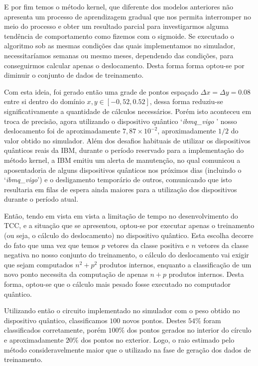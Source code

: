 E por fim temos o método kernel, que diferente dos modelos anteriores não apresenta um processo de aprendizagem gradual que nos permita interromper no meio do processo e obter um resultado parcial para investigarmos alguma tendência de comportamento como fizemos com o sigmoide. Se executado o algoritmo sob as mesmas condições das quais implementamos no simulador, necessitaríamos semanas ou mesmo meses, dependendo das condições, para conseguirmos calcular apenas o deslocamento. Desta forma forma optou-se por diminuir o conjunto de dados de treinamento.

Com esta ideia, foi gerado então uma grade de pontos espaçado $\Delta x= \Delta y = 0.08$ entre si dentro do domínio $x,y\in\left[-0,52,0.52\right]$, dessa forma reduziu-se significativamente a quantidade de cálculos necessários. Porém isto aconteceu em troca de precisão, agora utilizando o dispositivo quântico `\textit{ibmq\_vigo }' nosso deslocamento foi de aproximadamente $7,87\times10^{-2}$, aproximadamente $1/2$ do valor obtido no simulador. Além dos desafios habituais de utilizar os dispositivos quânticos reais da IBM, durante o período reservado para a implementação do método kernel, a IBM emitiu um alerta de manutenção, no qual comunicou a aposentadoria de alguns dispositivos quânticos nos próximos dias (incluindo o `\textit{ibmq\_vigo}')  e o desligamento temporário de outros, comunicando que isto resultaria em filas de espera ainda maiores para  a utilização dos dispositivos durante o período atual.

Então, tendo em vista em vista a limitação de tempo no desenvolvimento do TCC, e a situação que se apresentou, optou-se por executar apenas o treinamento (ou seja, o cálculo do deslocamento) no dispositivo quântico. Esta escolha decorre do fato que uma vez que temos $p$ vetores da classe positiva e $n$ vetores da classe negativa no nosso conjunto do treinamento, o cálculo do deslocamento vai exigir que sejam computados $n^2+p^2$ produtos internos, enquanto a classificação de um novo ponto necessita da computação de apenas $n+p$ produtos internos. Desta forma, optou-se que o cálculo mais pesado fosse executado no computador quântico. 

Utilizando então o circuito implementado no simulador com o peso obtido no dispositivo quântico, classificamos $100$ novos pontos. Destes $54\%$ foram classificados corretamente, porém $100\%$ dos pontos gerados no interior do círculo e aproximadamente $20\%$ dos pontos no exterior. Logo, o raio estimado pelo método consideravelmente maior que o utilizado na fase de geração dos dados de treinamento.

